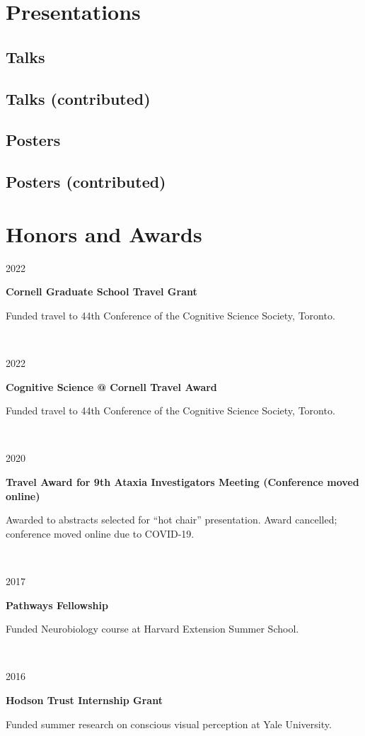 \documentclass{article}
\newcommand{\awardentry}[3]{
  \begin{minipage}[t]{.15\textwidth}
    \begin{flushright}
      \hfill {#1}
    \end{flushright}
  \end{minipage}
  \hfill\vline\hfill
  \begin{minipage}[t]{.80\textwidth}
    \textbf{#2}

    \footnotesize{#3}
  \end{minipage}\\\vspace{.25cm}
}
\begin{document}

\section{Presentations}

\subsection{Talks}
\nocite{*}
\printbibliography[heading=none]

\subsection{Talks (contributed)}
\nocite{*}
\printbibliography[heading=none]

\subsection{Posters}
\nocite{*}
\printbibliography[heading=none]

\subsection{Posters (contributed)}
\nocite{*}
\printbibliography[heading=none]


\section{Honors and Awards}

\awardentry{2022}{Cornell Graduate School Travel Grant}
{Funded travel to 44th Conference of the Cognitive Science Society, Toronto.}

\awardentry{2022}{Cognitive Science @ Cornell Travel Award}
{Funded travel to 44th Conference of the Cognitive Science Society, Toronto.}

\awardentry{2020}{Travel Award for 9th Ataxia Investigators Meeting (Conference moved online)}
{Awarded to abstracts selected for “hot chair” presentation. Award cancelled; conference moved online due to COVID-19.}

\awardentry{2017}{Pathways Fellowship}
{Funded Neurobiology course at Harvard Extension Summer School.}

\awardentry{2016 }{Hodson Trust Internship Grant}
{Funded summer research on conscious visual perception at Yale University.}
\end{document}
